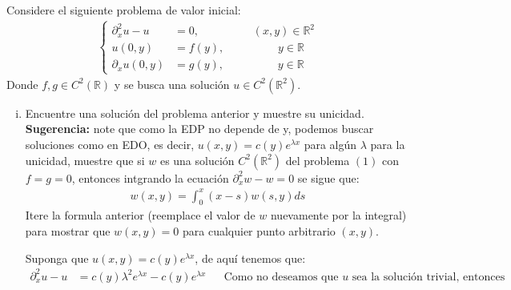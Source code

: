 
\usepackage{amsmath}
\usepackage{geometry}
\usepackage{tikz}
\usepackage{float}
\usepackage{graphics}
\usepackage{cancel}
\usepackage{enumerate}

\providecommand{\abs}[1]{\lvert#1\rvert}
\providecommand{\norm}[1]{\lVert#1\rVert}




\maketitle
\thispagestyle{empty}
\newpage

\begin{homeworkProblem}
Considere el siguiente problema de valor inicial:
\begin{align*}
    \begin{cases}
        \partial_{x}^{2}u-u&=0,\hspace{2cm}(x,y)\in\mathbb{R}^2\\
        u(0,y)&=f(y),\hspace{2cm}y\in\mathbb{R}\\
        \partial_{x}u(0,y)&=g(y),\hspace{2cm}y\in\mathbb{R}
    \end{cases}
\end{align*}
Donde $f,g\in C^{2}(\mathbb{R})$ y se busca una solución $u\in C^{2}(\mathbb{R}^2)$.
\begin{enumerate}[i)]
    \item Encuentre una solución del problema anterior y muestre su unicidad.\\
    \textbf{Sugerencia:} note que como la EDP no depende de y, podemos buscar soluciones como en EDO, es decir, $u(x,y)=c(y)e^{\lambda x}$ para algún $\lambda$ para la unicidad, muestre que si $w$ es una solución $C^{2}(\mathbb{R}^{2})$ del problema $(1)$ con $f=g=0$, entonces intgrando la ecuación $\partial_{x}^{2}w-w=0$ se sigue que:
    \begin{align*}
        w(x,y)=\int_{0}^{x}(x-s)w(s,y)ds
    \end{align*}
    Itere la formula anterior (reemplace el valor de $w$ nuevamente por la integral) para mostrar que $w(x,y)=0$ para cualquier punto arbitrario $(x,y)$.
    \begin{solucion}
        Suponga que $u(x,y)=c(y)e^{\lambda x}$, de aquí tenemos que:
        \begin{align*}
            \partial^{2}_{x}u-u&=c(y)\lambda^2e^{\lambda x}-c(y)e^{\lambda x} &&\text{Como no deseamos que $u$ sea la solución trivial, entonces}\\

\end{align*}
\end{solucion}
\end{enumerate}
\end{homeworkProblem}
